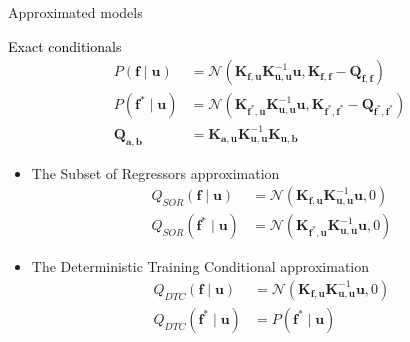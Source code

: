 \documentclass[10pt]{beamer}
\begin{document}
\begin{frame}{Approximated models}
    \begin{alertblock}{\textcolor{black}{Exact conditionals}}
    \[
        \begin{aligned}
         P(\bm f \mid \bm u) &= \mathcal{N}(\bm K_{\bm f, \bm u}\bm K_{\bm u, \bm u}^{-1} \bm u, \bm K_{\bm f, \bm f} - \bm Q_{\bm f, \bm f} )\\
         P(\bm f^* \mid \bm u) &= \mathcal{N}(\bm K_{\bm f^*, \bm u}\bm K_{\bm u, \bm u}^{-1} \bm u, \bm K_{\bm f^*, \bm f^*} - \bm Q_{\bm f^*, \bm f^*})\\
        \bm Q_{\bm a, \bm b} &= \bm K_{\bm a, \bm u} \bm K_{\bm u, \bm u}^{-1} \bm K_{\bm u, \bm b}
        \end{aligned}
    \]
    \end{alertblock}
    \begin{itemize}
        \item The Subset of Regressors approximation
            \[
                \begin{aligned}
                 Q_{SOR}(\bm f \mid \bm u) &= \mathcal{N}(\bm K_{\bm f, \bm u}\bm K_{\bm u, \bm u}^{-1} \bm u, 0 )\\
                 Q_{SOR}(\bm f^* \mid \bm u) &= \mathcal{N}(\bm K_{\bm f^*, \bm u}\bm K_{\bm u, \bm u}^{-1} \bm u, 0)
                \end{aligned}
            \]
        \item The Deterministic Training Conditional approximation 
            \[
                \begin{aligned}
                 Q_{DTC}(\bm f \mid \bm u) &= \mathcal{N}(\bm K_{\bm f, \bm u}\bm K_{\bm u, \bm u}^{-1} \bm u, 0 )\\
                 Q_{DTC}(\bm f^* \mid \bm u) &= P(\bm f^* \mid \bm u)
                \end{aligned}
            \]
    \end{itemize}
\end{frame}
\end{document}
